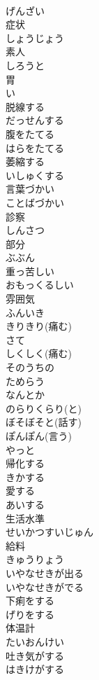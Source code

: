 \documentclass[8pt]{extreport}
\begin{document}
\begin{CJK}{UTF8}{min}
\\	げんざい
\\	症状	
\\	しょうじょう
\\	素人	
\\	しろうと
\\	胃	
\\	い
\\	脱線する	
\\	だっせんする
\\	腹をたてる	
\\	はらをたてる
\\	萎縮する	
\\	いしゅくする
\\	言葉づかい	
\\	ことばづかい
\\	診察	
\\	しんさつ
\\	部分	
\\	ぶぶん
\\	重っ苦しい	
\\	おもっくるしい
\\	雰囲気	
\\	ふんいき
\\	きりきり(痛む)	
\\	さて	
\\	しくしく(痛む)	
\\	そのうちの	
\\	ためらう	
\\	なんとか	
\\	のらりくらり(と)	
\\	ぼそぼそと(話す)	
\\	ぽんぽん(言う)	
\\	やっと	
\\	帰化する	
\\	きかする
\\	愛する	
\\	あいする
\\	生活水準	
\\	せいかつすいじゅん
\\	給料	
\\	きゅうりょう
\\	いやなせきが出る	
\\	いやなせきがでる
\\	下痢をする	
\\	げりをする
\\	体温計	
\\	たいおんけい
\\	吐き気がする	
\\	はきけがする

\end{CJK}
\end{document}
